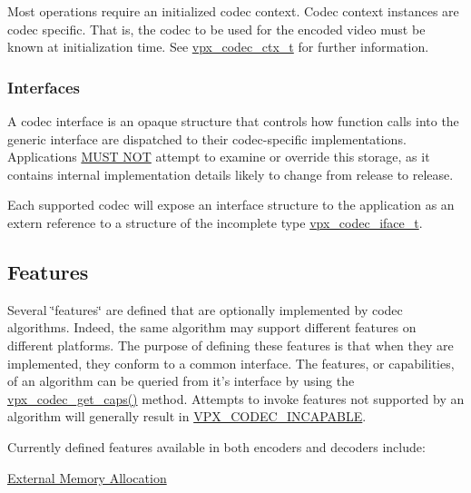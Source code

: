 Most operations require an initialized codec context. Codec context instances are codec specific. That is, the codec to be used for the encoded video must be known at initialization time. See \hyperlink{group__codec_gad03e2dfa6ae511db7d25be6bbb336233}{vpx\-\_\-codec\-\_\-ctx\-\_\-t} for further information.\hypertarget{usage_usage_ifaces}{}\subsubsection{Interfaces}\label{usage_usage_ifaces}
A codec interface is an opaque structure that controls how function calls into the generic interface are dispatched to their codec-\/specific implementations. Applications \hyperlink{rfc2119_MUSTNOT}{M\-U\-S\-T N\-O\-T} attempt to examine or override this storage, as it contains internal implementation details likely to change from release to release.

Each supported codec will expose an interface structure to the application as an {\ttfamily extern} reference to a structure of the incomplete type \hyperlink{group__codec_gad654f3da60151f5dfef70aca00ef1e9e}{vpx\-\_\-codec\-\_\-iface\-\_\-t}.\hypertarget{usage_usage_features}{}\subsection{Features}\label{usage_usage_features}
Several \char`\"{}features\char`\"{} are defined that are optionally implemented by codec algorithms. Indeed, the same algorithm may support different features on different platforms. The purpose of defining these features is that when they are implemented, they conform to a common interface. The features, or capabilities, of an algorithm can be queried from it's interface by using the \hyperlink{group__codec_ga43adff58759093401235fb99247c82b8}{vpx\-\_\-codec\-\_\-get\-\_\-caps()} method. Attempts to invoke features not supported by an algorithm will generally result in \hyperlink{group__codec_ggada1084710837ad363b92f2379dd2b8d2a4470784ba5a3ef84dc0697d5489dd292}{V\-P\-X\-\_\-\-C\-O\-D\-E\-C\-\_\-\-I\-N\-C\-A\-P\-A\-B\-L\-E}.

Currently defined features available in both encoders and decoders include\-:
\begin{DoxyItemize}
\item \hyperlink{usage_xma}{External Memory Allocation}
\end{DoxyItemize}

